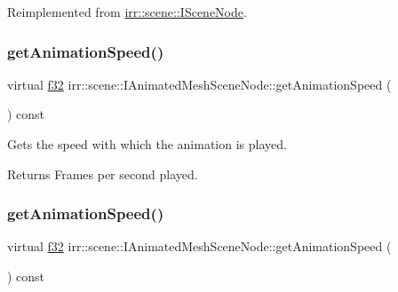 Reimplemented from \hyperlink{classirr_1_1scene_1_1ISceneNode_ac39832b55855dc59196053adbaec95cc}{irr\+::scene\+::\+I\+Scene\+Node}.

\mbox{\label{classirr_1_1scene_1_1IAnimatedMeshSceneNode_a246c21ec2ae5b3a5cecc10f9cc3625c4}} 
\subsubsection{\texorpdfstring{get\+Animation\+Speed()}{getAnimationSpeed()}\hspace{0.1cm}{\footnotesize\ttfamily [1/2]}}
{\footnotesize\ttfamily virtual \hyperlink{namespaceirr_a0277be98d67dc26ff93b1a6a1d086b07}{f32} irr\+::scene\+::\+I\+Animated\+Mesh\+Scene\+Node\+::get\+Animation\+Speed (\begin{DoxyParamCaption}{ }\end{DoxyParamCaption}) const\hspace{0.3cm}{\ttfamily [pure virtual]}}



Gets the speed with which the animation is played. 

\begin{DoxyReturn}{Returns}
Frames per second played. 
\end{DoxyReturn}
\mbox{\label{classirr_1_1scene_1_1IAnimatedMeshSceneNode_a246c21ec2ae5b3a5cecc10f9cc3625c4}} 
\subsubsection{\texorpdfstring{get\+Animation\+Speed()}{getAnimationSpeed()}\hspace{0.1cm}{\footnotesize\ttfamily [2/2]}}
{\footnotesize\ttfamily virtual \hyperlink{namespaceirr_a0277be98d67dc26ff93b1a6a1d086b07}{f32} irr\+::scene\+::\+I\+Animated\+Mesh\+Scene\+Node\+::get\+Animation\+Speed (\begin{DoxyParamCaption}{ }\end{DoxyParamCaption}) const\hspace{0.3cm}{\ttfamily [pure virtual]}}



